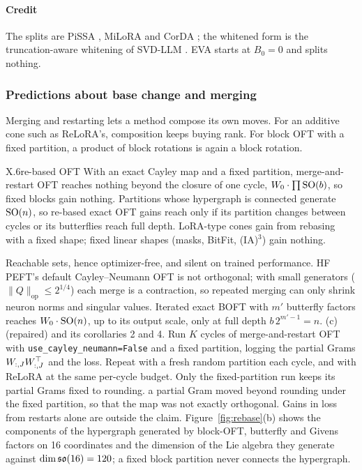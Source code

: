 \paragraph{Credit}
The splits are PiSSA \citep{meng2024pissa}, MiLoRA \citep{wang2024milora} and CorDA \citep{yang2024corda}; the whitened
form is the truncation-aware whitening of SVD-LLM \citep{xwang2025svdllm}. EVA \citep{paischer2024parameter} starts at
$B_0=0$ and splits nothing.

\subsubsection{Predictions about base change and merging}\label{sec:predictions-base}

Merging and restarting lets a method compose its own moves. For an additive cone such as ReLoRA's, composition keeps
buying rank. For block OFT with a fixed partition, a product of block rotations is again a block rotation.

\begin{prediction}{X.6}{re-based OFT}
With an exact Cayley map and a fixed partition, merge-and-restart OFT reaches nothing beyond the closure of one cycle,
$W_0\cdot\prod\mathrm{SO}(b)$, so fixed blocks gain nothing. Partitions whose hypergraph is connected generate $\mathrm{SO}(n)$, so re-based
exact OFT gains reach only if its partition changes between cycles or its butterflies reach full depth. LoRA-type cones
gain from rebasing with a fixed shape; fixed linear shapes (masks, BitFit, (IA)$^3$) gain nothing.
\begin{predmeta}
   Reachable sets, hence optimizer-free, and silent on trained performance. HF PEFT's default
    Cayley--Neumann OFT is not orthogonal; with small generators ($\lVert Q\rVert_{\mathrm{op}}\le2^{1/4}$) each merge
    is a contraction, so repeated merging can only shrink neuron norms and singular values. Iterated exact BOFT with
    $m'$ butterfly factors reaches $W_0\cdot\mathrm{SO}(n)$, up to its output scale, only at full depth $b\,2^{m'-1}=n$.
   (c) (repaired) and its corollaries 2 and 4.
   Run $K$ cycles of merge-and-restart OFT with \texttt{use\_cayley\_neumann=False} and a fixed
    partition, logging the partial Grams $W_{:,J}W_{:,J}^{\top}$ and the loss. Repeat with a fresh random partition each
    cycle, and with ReLoRA at the same per-cycle budget. Only the fixed-partition run keeps its partial Grams fixed to
    rounding.
   a partial Gram moved beyond rounding under the fixed partition, so that the map was not
    exactly orthogonal. Gains in loss from restarts alone are outside the claim.
   Figure~\ref{fig:rebase}(b) shows the components of the hypergraph generated by block-OFT, butterfly
    and Givens factors on 16 coordinates and the dimension of the Lie algebra they generate against
    $\dim\mathfrak{so}(16)=120$; a fixed block partition never connects the hypergraph.
\end{predmeta}
\end{prediction}

